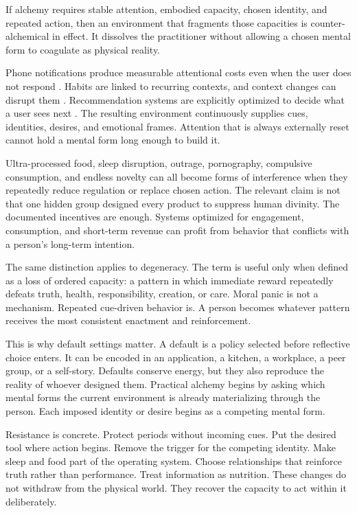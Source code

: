 \documentclass[11pt]{article}
\theoremstyle{plain}
\theoremstyle{definition}
\begin{document}
If alchemy requires stable attention, embodied capacity, chosen identity, and repeated
action, then an environment that fragments those capacities is counter-alchemical in
effect. It dissolves the practitioner without allowing a chosen mental form to
coagulate as physical reality.

Phone notifications produce measurable attentional costs even when the user does not
respond \citep{stothart2015notifications,upshaw2022notifications}. Habits are linked
to recurring contexts, and context changes can disrupt them
\citep{wood2005habits,wood2016psychology}. Recommendation systems are explicitly
optimized to decide what a user sees next \citep{covington2016youtube}. The resulting
environment continuously supplies cues, identities, desires, and emotional frames.
Attention that is always externally reset cannot hold a mental form long enough to
build it.

Ultra-processed food, sleep disruption, outrage, pornography, compulsive consumption,
and endless novelty can all become forms of interference when they repeatedly reduce
regulation or replace chosen action. The relevant claim is not that one hidden group
designed every product to suppress human divinity. The documented incentives are
enough. Systems optimized for engagement, consumption, and short-term revenue can
profit from behavior that conflicts with a person's long-term intention.

The same distinction applies to degeneracy. The term is useful only when defined as a
loss of ordered capacity: a pattern in which immediate reward repeatedly defeats
truth, health, responsibility, creation, or care. Moral panic is not a mechanism.
Repeated cue-driven behavior is. A person becomes whatever pattern receives the most
consistent enactment and reinforcement.

This is why default settings matter. A default is a policy selected before reflective
choice enters. It can be encoded in an application, a kitchen, a workplace, a peer
group, or a self-story. Defaults conserve energy, but they also reproduce the reality
of whoever designed them. Practical alchemy begins by asking which mental forms the
current environment is already materializing through the person. Each imposed identity
or desire begins as a competing mental form.

Resistance is concrete. Protect periods without incoming cues. Put the desired tool
where action begins. Remove the trigger for the competing identity. Make sleep and
food part of the operating system. Choose relationships that reinforce truth rather
than performance. Treat information as nutrition. These changes do not withdraw from
the physical world. They recover the capacity to act within it deliberately.
\end{document}
